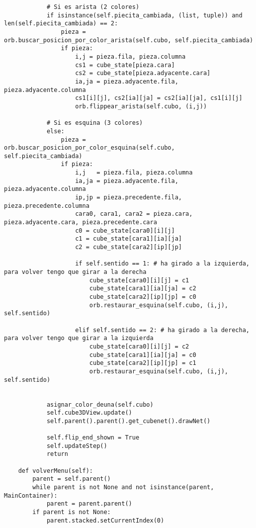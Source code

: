 \begin{lstlisting}
            # Si es arista (2 colores)
            if isinstance(self.piecita_cambiada, (list, tuple)) and len(self.piecita_cambiada) == 2:
                pieza = orb.buscar_posicion_por_color_arista(self.cubo, self.piecita_cambiada)
                if pieza:
                    i,j = pieza.fila, pieza.columna
                    cs1 = cube_state[pieza.cara]
                    cs2 = cube_state[pieza.adyacente.cara]
                    ia,ja = pieza.adyacente.fila, pieza.adyacente.columna
                    cs1[i][j], cs2[ia][ja] = cs2[ia][ja], cs1[i][j]
                    orb.flippear_arista(self.cubo, (i,j))

            # Si es esquina (3 colores)
            else:
                pieza = orb.buscar_posicion_por_color_esquina(self.cubo, self.piecita_cambiada)
                if pieza:
                    i,j   = pieza.fila, pieza.columna
                    ia,ja = pieza.adyacente.fila, pieza.adyacente.columna
                    ip,jp = pieza.precedente.fila, pieza.precedente.columna
                    cara0, cara1, cara2 = pieza.cara, pieza.adyacente.cara, pieza.precedente.cara
                    c0 = cube_state[cara0][i][j]
                    c1 = cube_state[cara1][ia][ja]
                    c2 = cube_state[cara2][ip][jp]
                        
                    if self.sentido == 1: # ha girado a la izquierda, para volver tengo que girar a la derecha
                        cube_state[cara0][i][j] = c1
                        cube_state[cara1][ia][ja] = c2
                        cube_state[cara2][ip][jp] = c0
                        orb.restaurar_esquina(self.cubo, (i,j), self.sentido)
                        
                    elif self.sentido == 2: # ha girado a la derecha, para volver tengo que girar a la izquierda
                        cube_state[cara0][i][j] = c2
                        cube_state[cara1][ia][ja] = c0
                        cube_state[cara2][ip][jp] = c1
                        orb.restaurar_esquina(self.cubo, (i,j), self.sentido)
                        

            asignar_color_deuna(self.cubo)
            self.cube3DView.update()
            self.parent().parent().get_cubenet().drawNet()

            self.flip_end_shown = True
            self.updateStep()
            return

    def volverMenu(self):
        parent = self.parent()
        while parent is not None and not isinstance(parent, MainContainer):
            parent = parent.parent()
        if parent is not None:
            parent.stacked.setCurrentIndex(0)  


\end{lstlisting}
